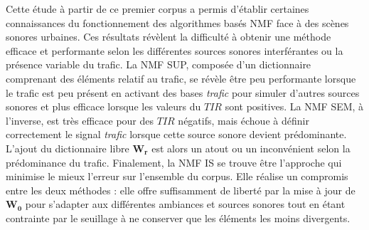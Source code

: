 Cette étude à partir de ce premier corpus a permis d'établir certaines connaissances du fonctionnement des algorithmes basés NMF face à des scènes sonores urbaines. Ces résultats révèlent la difficulté à obtenir une méthode efficace et performante selon les différentes sources sonores interférantes ou la présence variable du trafic.
La NMF SUP, composée d'un dictionnaire comprenant des éléments relatif au trafic, se révèle être peu performante lorsque le trafic est peu présent en activant des bases \textit{trafic} pour simuler d'autres sources sonores et plus efficace lorsque les valeurs du $TIR$ sont positives. La NMF SEM, à l'inverse, est très efficace pour des $TIR$ négatifs, mais échoue à définir correctement le signal \textit{trafic} lorsque cette source sonore devient prédominante. L'ajout du dictionnaire libre $\mathbf{W_r}$ est alors un atout ou un inconvénient selon la prédominance du trafic. Finalement, la NMF IS se trouve être l'approche qui minimise le mieux l'erreur sur l'ensemble du corpus. Elle réalise un compromis entre les deux méthodes : elle offre suffisamment de liberté par la mise à jour de $\mathbf{W_0}$ pour s'adapter aux différentes ambiances et sources sonores tout en étant contrainte par le seuillage à ne conserver que les éléments les moins divergents.\\





%
